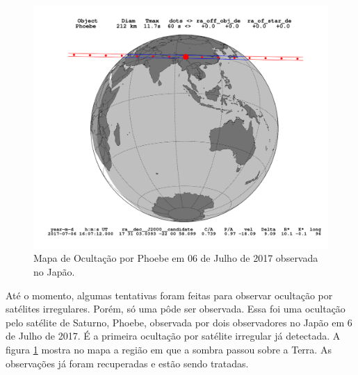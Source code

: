 \documentclass[12pt,a4paper]{report}
\begin{document}
\begin{figure}[h]
\begin{centering}
\includegraphics[width = 16.0cm]{figuras/Phoebe_2017-07-06.png}   
\caption{Mapa de Ocultação por Phoebe em 06 de Julho de 2017 observada no Japão.
}
\label{Fig: ocultacao}
\end{centering}
\end{figure}

Até o momento, algumas tentativas foram feitas para observar ocultação por satélites irregulares. Porém, só uma pôde ser observada. Essa foi uma ocultação pelo satélite de Saturno, Phoebe, observada por dois observadores no Japão em 6 de Julho de 2017. É a primeira ocultação por satélite irregular já detectada. A figura \ref{Fig: ocultacao} mostra no mapa a região em que a sombra passou sobre a Terra. As observações já foram recuperadas e estão sendo tratadas.
\end{document}
